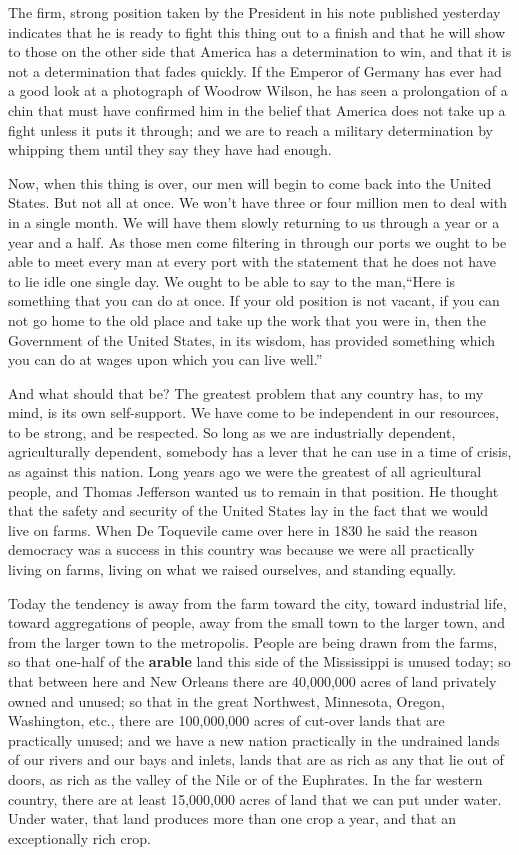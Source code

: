 \begin{linenumbers}
\indent The firm, strong position taken by the President in his note published yesterday indicates that he is ready to fight this thing out to a finish and that he will show to those on the other side that America has a determination to win, and that it is not a determination that fades quickly. If the Emperor of Germany has ever had a good look at a photograph of Woodrow Wilson, he has seen a prolongation of a chin that must have confirmed him in the belief that America does not take up a fight unless it puts it through; and we are to reach a military determination by whipping them until they say they have had enough.

\indent Now, when this thing is over, our men will begin to come back into the United States. But not all at once. We won't have three or four million men to deal with in a single month. We will have them slowly returning to us through a year or a year and a half. As those men come filtering in through our ports we ought to be able to meet every man at every port with the statement that he does not have to lie idle one single day. We ought to be able to say to the man,``Here is something that you can do at once. If your old position is not vacant, if you can not go home to the old place and take up the work that you were in, then the Government of the United States, in its wisdom, has provided something which you can do at wages upon which you can live well.''

\indent And what should that be? The greatest problem that any country has, to my mind, is its own self-support. We have come to be independent in our resources, to be strong, and be respected. So long as we are industrially dependent, agriculturally dependent, somebody has a lever that he can use in a time of crisis, as against this nation. Long years ago we were the greatest of all agricultural people, and Thomas Jefferson wanted us to remain in that position. He thought that the safety and security of the United States lay in the fact that we would live on farms. When De Toquevile came over here in 1830 he said the reason democracy was a success in this country was because we were all practically living on farms, living on what we raised ourselves, and standing equally.

\indent Today the tendency is away from the farm toward the city, toward industrial life, toward aggregations of people, away from the small town to the larger town, and from the larger town to the metropolis. People are being drawn from the farms, so that one-half of the \textbf{arable} land this side of the Mississippi is unused today; so that between here and New Orleans there are 40,000,000 acres of land privately owned and unused; so that in the great Northwest, Minnesota, Oregon, Washington, etc., there are 100,000,000 acres of cut-over lands that are practically unused; and we have a new nation practically in the undrained lands of our rivers and our bays and inlets, lands that are as rich as any that lie out of doors, as rich as the valley of the Nile or of the Euphrates. In the far western country, there are at least 15,000,000 acres of land that we can put under water. Under water, that land produces more than one crop a year, and that an exceptionally rich crop.


\end{linenumbers}
